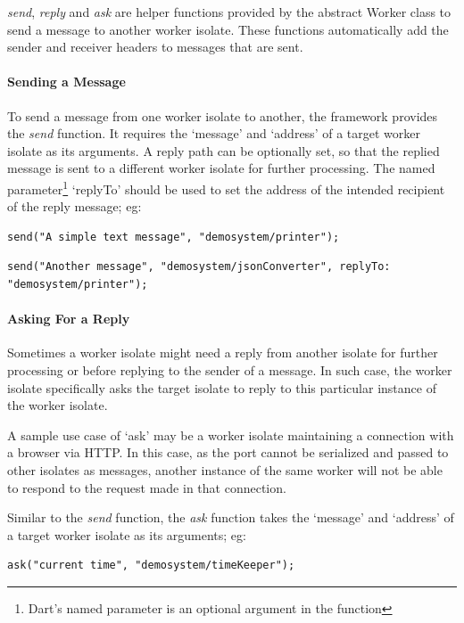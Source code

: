   \emph{send}, \emph{reply} and \emph{ask} are helper functions provided by the abstract Worker class to send a message to another worker isolate. These functions automatically add the sender and receiver headers to messages that are sent.

  \paragraph{Sending a Message}
  \label{para:sendMessage}
  To send a message from one worker isolate to another, the framework provides the \emph{send} function. It requires the ‘message’ and ‘address’ of a target worker isolate as its arguments. A reply path can be optionally set, so that the replied message is sent to a different worker isolate for further processing. The named parameter\footnote{Dart's named parameter is an optional argument in the function} ‘replyTo’ should be used to set the address of the intended recipient of the reply message; eg:
\begin{lstlisting}[numbers=none]
  send("A simple text message", "demosystem/printer");
\end{lstlisting}

\begin{lstlisting}[numbers=none]
  send("Another message", "demosystem/jsonConverter", replyTo: "demosystem/printer");
\end{lstlisting}

  \paragraph{Asking For a Reply}
  \label{subsec:askMessage}
  Sometimes a worker isolate might need a reply from another isolate for further processing or before replying to the sender of a message. In such case, the worker isolate specifically asks the target isolate to reply to this particular instance of the worker isolate.

  A sample use case of ‘ask’ may be a worker isolate maintaining a connection with a browser via HTTP. In this case, as the port cannot be serialized and passed to other isolates as messages, another instance of the same worker will not be able to respond to the request made in that connection.

  Similar to the \emph{send} function, the \emph{ask} function takes the ‘message’ and ‘address’ of a target worker isolate as its arguments; eg:
\begin{lstlisting}[numbers=none]
  ask("current time", "demosystem/timeKeeper");
\end{lstlisting}

